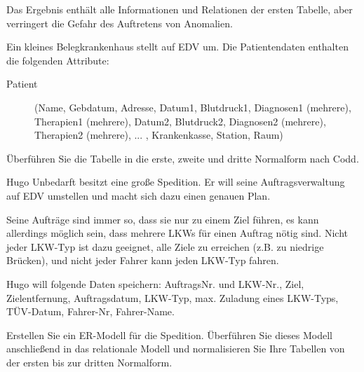 \documentclass[9pt,a4paper]{arbeitsblatt}
\begin{document}
Das Ergebnis enthält alle Informationen und Relationen der ersten Tabelle, aber
verringert die Gefahr des Auftretens von Anomalien.

\clearpage
\ReiheTitel
\large

\begin{aufgabe}
	Ein kleines Belegkrankenhaus stellt auf EDV um. Die Patientendaten enthalten
	die folgenden Attribute:
	\begin{description}
		\item[Patient] (Name, Gebdatum, Adresse, Datum1, Blutdruck1,
			Diagnosen1 (mehrere), Therapien1 (mehrere), Datum2, Blutdruck2, Diagnosen2
			(mehrere), Therapien2 (mehrere), ... , Krankenkasse, Station, Raum)
	\end{description}

	Überführen Sie die Tabelle in die erste, zweite und dritte Normalform nach
	Codd.
\end{aufgabe}

\begin{aufgabe}
	Hugo Unbedarft besitzt eine große Spedition. Er will seine Auftragsverwaltung
	auf EDV umstellen und macht sich dazu einen genauen Plan.

	Seine Aufträge sind immer so, dass sie nur zu einem Ziel führen, es kann
	allerdings möglich sein, dass mehrere LKWs für einen Auftrag nötig sind. Nicht
	jeder LKW-Typ ist dazu geeignet, alle Ziele zu erreichen (z.B. zu niedrige
	Brücken), und nicht jeder Fahrer kann jeden LKW-Typ fahren.

	Hugo will folgende Daten speichern: AuftragsNr. und LKW-Nr., Ziel,
	Zielentfernung, Auftragsdatum, LKW-Typ, max. Zuladung eines LKW-Typs,
	TÜV-Datum, Fahrer-Nr, Fahrer-Name.

	Erstellen Sie ein ER-Modell für die Spedition. Überführen Sie dieses Modell
	anschließend in das relationale Modell und normalisieren Sie Ihre Tabellen von
	der ersten bis zur dritten Normalform.
\end{aufgabe}
\end{document}

